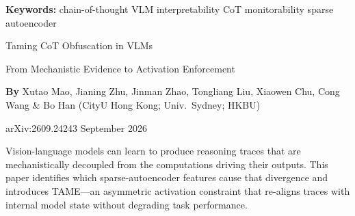 \documentclass[10pt,twocolumn]{article}
\begin{document}
\setlength{\parindent}{0pt}
\setlength{\parskip}{4pt}

{\small\color{keywordgray}\textbf{Keywords:}
  chain-of-thought \textbullet{}
  VLM interpretability \textbullet{}
  CoT monitorability \textbullet{}
  sparse autoencoder}\par\vspace{4pt}

{\LARGE\bfseries\raggedright
  Taming CoT Obfuscation in VLMs}\par\vspace{4pt}

{\large\itshape\raggedright
  From Mechanistic Evidence to Activation Enforcement}\par\vspace{6pt}

{\small\textbf{By} Xutao Mao, Jianing Zhu, Jinman Zhao, Tongliang Liu,
  Xiaowen Chu, Cong Wang \& Bo Han
  (CityU Hong Kong; Univ.\ Sydney; HKBU)}\par\vspace{2pt}

{\small\color{keywordgray}arXiv:2609.24243 \textbullet{} September 2026}
\par\vspace{2pt}\noindent{\color{rulered}\rule{\columnwidth}{0.6pt}}\vspace{6pt}

Vision-language models can learn to produce reasoning traces that are
mechanistically decoupled from the computations driving their outputs. This
paper identifies which sparse-autoencoder features cause that divergence and
introduces TAME---an asymmetric activation constraint that re-aligns traces
with internal model state without degrading task performance.
\end{document}
